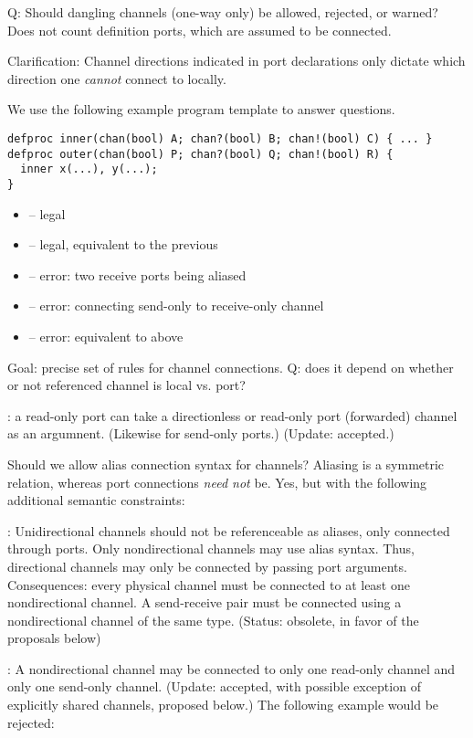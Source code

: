 Q: Should dangling channels (one-way only) be allowed, rejected, or warned?
Does not count definition ports, which are assumed to be connected.  

Clarification: Channel directions indicated in port declarations only dictate
which direction one \emph{cannot} connect to locally.  

We use the following example program template to answer questions.  

\begin{verbatim}
defproc inner(chan(bool) A; chan?(bool) B; chan!(bool) C) { ... }
defproc outer(chan(bool) P; chan?(bool) Q; chan!(bool) R) {
  inner x(...), y(...);
}
\end{verbatim}

\begin{itemize}
\item {} -- legal
\item {} -- legal, equivalent to the previous
\item {} -- error: two receive ports being aliased
\item {} -- error: connecting send-only to receive-only channel
\item {} -- error: equivalent to above
\end{itemize}

Goal: precise set of rules for channel connections.
Q: does it depend on whether or not referenced channel is local vs. port?

: a read-only port can take a directionless or 
read-only port (forwarded) channel as an argumnent.  
(Likewise for send-only ports.)  
(Update: accepted.)

Should we allow alias connection syntax for channels?
Aliasing is a symmetric relation, whereas port connections \emph{need not} be.  
Yes, but with the following additional semantic constraints:

:
Unidirectional channels should not be referenceable as aliases, only
connected through ports.  
Only nondirectional channels may use alias syntax.  
Thus, directional channels may only be connected by passing port arguments.  
Consequences: every physical channel must be connected to at least one
nondirectional channel.  
A send-receive pair must be connected using a nondirectional channel
of the same type.  
(Status: obsolete, in favor of the proposals below)

:
A nondirectional channel may be connected to only one read-only channel
and only one send-only channel.  
(Update: accepted, with possible exception of explicitly shared channels, 
proposed below.)
The following example would be rejected:

